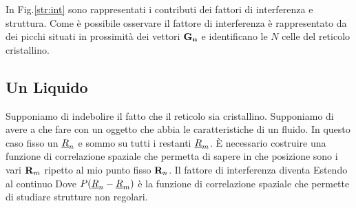 In Fig.\ref{str:int} sono rappresentati i contributi dei fattori di interferenza e struttura. Come è possibile osservare il fattore di interferenza è rappresentato da dei picchi situati in prossimità dei vettori $ {\it\bf G_n}$ e identificano le $N$ celle del reticolo cristallino.
\subsection{Un Liquido}
Supponiamo di indebolire il fatto che il reticolo sia cristallino. Supponiamo di avere a che fare con un oggetto che abbia le caratteristiche di un fluido. In questo caso fisso un $\xv{R} _n$ e sommo su tutti i restanti $\xv{R} _m$. \`E necessario costruire una funzione di correlazione spaziale che permetta di sapere in che posizione sono i vari ${\it\bf R} _m$ ripetto al mio punto fisso ${\it\bf R} _n$. Il fattore di interferenza diventa 
Estendo al continuo
Dove $P(\xv{R} _n-\xv{R} _m)$ è la funzione di correlazione spaziale che permette di studiare strutture non regolari.

